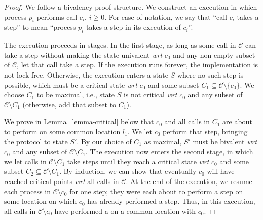 \begin{proof}
We follow a bivalency proof structure. We construct an execution in which process $p_i$ performs call $c_i$, $i\geq0$. For ease of notation, we say that ``call $c_i$ takes a step'' to mean ``process $p_i$ takes a step in its execution of $c_i$''.

The execution proceeds in stages. In the first stage, as long as some call in $\mathcal{C}$ can take a step without making the state univalent \textit{wrt} $c_0$ and any non-empty subset of $\mathcal{C}$, let that call take a step. If the execution runs forever, the implementation is not lock-free. Otherwise, the execution enters a state $S$ where no such step is possible, which must be a critical state \textit{wrt} $c_0$ and some subset $C_1 \subseteq \mathcal{C}\setminus\lbrace c_0 \rbrace$. We choose $C_1$ to be maximal, i.e., state $S$ is not critical \textit{wrt} $c_0$ and any subset of $\mathcal{C}\setminus C_1$ (otherwise, add that subset to $C_1$).

We prove in Lemma~\ref{lemma-critical} below that $c_0$ and all calls in $C_1$ are about to perform \cas{} on some common location $l_1$. We let $c_0$ perform that \cas{} step, bringing the protocol to state $S'$. By our choice of $C_1$ as maximal, $S'$ must be bivalent \textit{wrt} $c_0$ and any subset of $\mathcal{C}\setminus C_1$. The execution now enters the second stage, in which we let calls in $\mathcal{C}\setminus C_1$ take steps until they reach a critical state \textit{wrt} $c_0$ and some subset $C_2 \subseteq \mathcal{C}\setminus C_1$. By induction, we can show that eventually $c_0$ will have reached critical points \textit{wrt} all calls in $\mathcal{C}$. At the end of the execution, we resume each process in $\mathcal{C}\setminus c_0$ for one step; they were each about to perform a \cas{} step on some location on which $c_0$ has already performed a \cas{} step. Thus, in this execution, all calls in $\mathcal{C}\setminus c_0$ have performed a \cas{} on a common location with $c_0$.
\end{proof}

